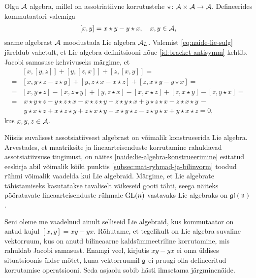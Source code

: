 \begin{naide}\label{naide:lie-algebra-konstrueerimine}
    Olgu $\mathcal{A}$ algebra, millel on assotriatiivne korrutustehe
    $\star \colon \mathcal{A} \times \mathcal{A} \to \mathcal{A}$. Defineerides kommutaatori valemiga
    \begin{align}\label{eq:naide-lie-sulg}
        [x, y] = x \star y - y \star x,\quad x, y \in \mathcal{A},
    \end{align}
    saame algebrast $\mathcal{A}$ moodustada Lie algebra $\mathcal{A}_L$. Valemist
    \eqref{eq:naide-lie-sulg} järeldub vahetult, et Lie algebra
    definitsiooni nõue \eqref{id:bracket-antisymm} kehtib. Jacobi samasuse
    kehvivuseks märgime, et
    \begin{align*}
        &\left[x, \left[y, z\right]\right] + 
            \left[y, \left[z, x\right]\right] + 
            \left[z, \left[x, y\right]\right] = \\
        =& \left[x, y \star z - z \star y \right] + 
            \left[y, z \star x - x \star z \right] + 
            \left[z, x \star y - y \star x \right] = \\
        =& \left[x, y \star z\right] - \left[x, z \star y\right] + 
            \left[y, z \star x\right] - \left[x, x \star z\right] + 
            \left[z, x \star y\right] - \left[z, y \star x\right] = \\
        =&\ x \star y \star z - y \star z \star x - x \star z \star y +
            z \star y \star x + y \star z \star x - z \star x \star y\, - \\
         &\ y \star x \star z + x \star z \star y + z \star x \star y -
            x \star y \star z - z \star y \star x + y \star x \star z = 0,
    \end{align*}
    kus $x, y, z \in \mathcal{A}$.
\end{naide}

Niisiis suvalisest assotsiatiivsest algebrast on võimalik konstrueerida
Lie algebra. Arvestades, et maatriksite ja lineaarteisenduste korrutamine
rahuldavad assotsiatiivsuse tingimust, on näites
\ref{naide:lie-algebra-konstrueerimine} esitatud eeskirja abil
võimalik kõiki punktis \ref{subsec:mat-ryhmad-ja-bilinvorm} toodud
rühmi võimalik vaadelda kui Lie algebraid. Märgime, et Lie algebrate
tähistamiseks kasutatakse tavaliselt väikeseid gooti tähti, seega näiteks
pööratavate lineaarteisenduste rühmale $\operatorname{GL}(n)$ vastavaks Lie algebraks on
$\mathfrak{gl(n)}$.

Seni oleme me vaadelnud ainult selliseid Lie algebraid, kus kommutaator
on antud kujul $[x, y] = xy - yx$. Rõhutame, et tegelikult on Lie algebra
suvaline vektorruum, kus on anutd bilineaarne kaldsümmeetriline korrutamine,
mis rahuldab Jacobi samasust. Enamgi veel, kirjutis $xy - yx$ ei oma üldises
situatsioonis üldse mõtet, kuna vektorruumil $\mathfrak{g}$ ei pruugi olla defineeritud
korrutamise operatsiooni. Seda asjaolu sobib hästi ilmsetama järgminenäide.

